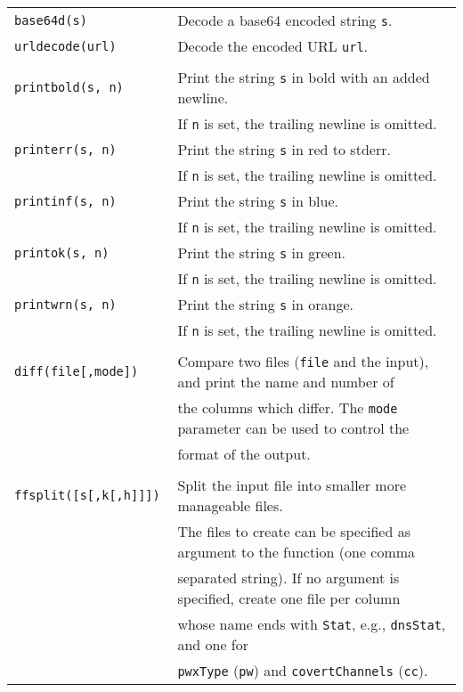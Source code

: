 \documentclass[documentation]{subfiles}
\begin{document}
\begin{longtable}{>{\tt}ll}
    base64d(s)                  & Decode a base64 encoded string {\tt s}.\\
    urldecode(url)              & Decode the encoded URL {\tt url}.\\
    \\
    printbold(s, n)             & Print the string {\tt s} in bold with an added newline.\\
                                & If {\tt n} is set, the trailing newline is omitted.\\
    printerr(s, n)              & Print the string {\tt s} in red to stderr.\\
                                & If {\tt n} is set, the trailing newline is omitted.\\
    printinf(s, n)              & Print the string {\tt s} in blue.\\
                                & If {\tt n} is set, the trailing newline is omitted.\\
    printok(s, n)               & Print the string {\tt s} in green.\\
                                & If {\tt n} is set, the trailing newline is omitted.\\
    printwrn(s, n)              & Print the string {\tt s} in orange.\\
                                & If {\tt n} is set, the trailing newline is omitted.\\
    \\
    diff(file[,mode])           & Compare two files ({\tt file} and the input), and print the name and number of\\
                                & the columns which differ. The {\tt mode} parameter can be used to control the\\
                                & format of the output.\\
    \\
    ffsplit([s[,k[,h]]])        & Split the input file into smaller more manageable files.\\
                                & The files to create can be specified as argument to the function (one comma\\
                                & separated string). If no argument is specified, create one file per column\\
                                & whose name ends with {\tt Stat}, e.g., {\tt dnsStat}, and one for \\
                                & {\tt pwxType} ({\tt pw}) and {\tt covertChannels} ({\tt cc}).\\

\end{longtable}
\end{document}
